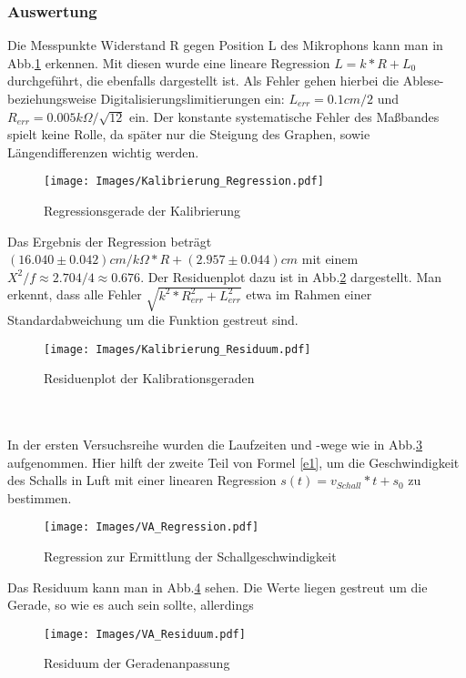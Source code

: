 \documentclass[]{article}
\begin{document}
	\subsubsection{Auswertung}
	
	Die Messpunkte Widerstand R gegen Position L des Mikrophons kann man in Abb.\ref{Kalib_Reg} erkennen. Mit diesen wurde eine lineare Regression $L=k*R+L_0$ durchgeführt, die ebenfalls dargestellt ist. Als Fehler gehen hierbei die Ablese- beziehungsweise Digitalisierungslimitierungen ein: $L_{err}=0.1cm/2$ und $R_{err}=0.005k\Omega/\sqrt{12}$ ein. Der konstante systematische Fehler des Maßbandes spielt keine Rolle, da später nur die Steigung des Graphen, sowie Längendifferenzen wichtig werden.
	
	\begin{figure}
	\begin{center}
		\texttt{[image: Images/Kalibrierung\_Regression.pdf]}
		\caption{Regressionsgerade der Kalibrierung}             
		\label{Kalib_Reg}               
	\end{center}            
	\end{figure}            
    Das Ergebnis der Regression beträgt $(16.040\pm0.042)cm/k\Omega*R+(2.957\pm0.044)cm$ mit einem $X^2/f \approx 2.704/4 \approx 0.676$. Der Residuenplot dazu ist in Abb.\ref{Kalib_Res} dargestellt. Man erkennt, dass alle Fehler $\sqrt{k^2*R_{err}^2+L_{err}^2}$ etwa im Rahmen einer Standardabweichung um die Funktion gestreut sind.                     
	\begin{figure}
	\begin{center}
		\texttt{[image: Images/Kalibrierung\_Residuum.pdf]}
		\caption{Residuenplot der Kalibrationsgeraden}
		\label{Kalib_Res}
	\end{center}
	\end{figure}
	\\ \\
	In der ersten Versuchsreihe wurden die Laufzeiten und -wege wie in Abb.\ref{Va_Reg} aufgenommen. Hier hilft der zweite Teil von Formel \ref{e1}, um die Geschwindigkeit des Schalls in Luft mit einer linearen Regression $s(t)=v_{Schall}*t+s_0$ zu bestimmen. 
	
	\begin{figure}
	\begin{center}
		\texttt{[image: Images/VA\_Regression.pdf]}
		\caption{Regression zur Ermittlung der Schallgeschwindigkeit}
		\label{Va_Reg}
	\end{center}
	\end{figure}	
	Das Residuum kann man in Abb.\ref{Va_Res} sehen. Die Werte liegen gestreut um die Gerade, so wie es auch sein sollte, allerdings 
	\begin{figure}
	\begin{center}
		\texttt{[image: Images/VA\_Residuum.pdf]}
		\caption{Residuum der Geradenanpassung}
		\label{Va_Res}
	\end{center}
	\end{figure}	
\end{document}
